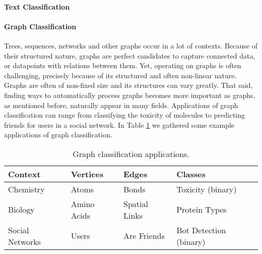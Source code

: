 

\paragraph{Text Classification}

\paragraph{Graph Classification}
Trees, sequences, networks and other graphs occur in a lot of contexts.
Because of their structured nature, graphs are perfect candidates to capture connected data, or datapoints with relations between them.
Yet, operating on graphs is often challenging, precisely because of its structured and often non-linear nature.
Graphs are often of non-fixed size and its structures can vary greatly.
That said, finding ways to automatically process graphs becomes more important as graphs, as mentioned before, naturally appear in many fields.
Applications of graph classification can range from classifying the toxicity of molecules to predicting friends for users in a social network.
In Table \ref{table:graph_classification_examples} we gathered some example applications of graph classification.

\begin{table}[htb!]
\centering
\renewcommand*{\arraystretch}{0.95}
\begin{tabular}{llll}
Context & Vertices & Edges & Classes \\
\midrule
Chemistry & Atoms & Bonds & Toxicity (binary) \\
Biology & Amino Acids & Spatial Links & Protein Types \\ 
Social Networks & Users & Are Friends & Bot Detection (binary) \\
\bottomrule
\end{tabular}%
\caption[Table: Graph Classification Applications]{Graph classification applications.}%
\label{table:graph_classification_examples}
\end{table}

